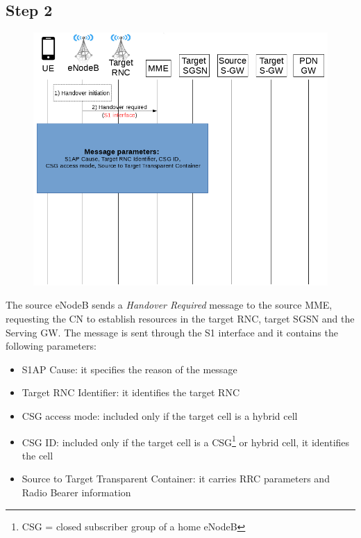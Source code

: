 \subsection*{Step 2}
\begin{figure}[htb]
	\centering
	\includegraphics[width=0.9\linewidth]{img/2.png}
	\label{fig:2}
\end{figure}
The source eNodeB sends a \emph{Handover Required} message to the
source MME, requesting the CN to establish resources in the target RNC,
target SGSN and the Serving GW. The message is sent through the S1 interface and
it contains the following parameters:
\begin{itemize}
	\item S1AP Cause: it specifies the reason of the message
	\item Target RNC Identifier: it identifies the target RNC
	\item CSG access mode: included only if the target cell is a hybrid cell
	\item CSG ID: included only if the target cell is a CSG\footnote{CSG = closed
	subscriber group of a home eNodeB} or hybrid cell, it	identifies the cell
	\item Source to Target Transparent Container: it carries RRC parameters and
	Radio Bearer information
\end{itemize}


